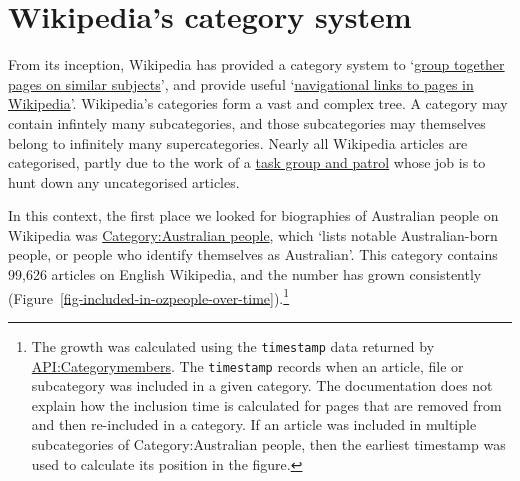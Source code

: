 \documentclass[
  a4paper,
  DIV=11,
  numbers=noendperiod]{scrreprt}
\begin{document}
\hypertarget{wikipedias-category-system}{%
\section{Wikipedia's category system}\label{wikipedias-category-system}}

From its inception, Wikipedia has provided a category system to
`\href{https://en.wikipedia.org/w/index.php?title=Help:Category\&oldid=1174603713}{group
together pages on similar subjects}', and provide useful
`\href{https://en.wikipedia.org/w/index.php?title=Wikipedia:Categorization\&oldid=1181497476}{navigational
links to pages in Wikipedia}'. Wikipedia's categories form a vast and
complex tree. A category may contain infintely many subcategories, and
those subcategories may themselves belong to infinitely many
supercategories. Nearly all Wikipedia articles are categorised, partly
due to the work of a
\href{https://en.wikipedia.org/wiki/Wikipedia:WikiProject_Categories/uncategorized}{task
group and patrol} whose job is to hunt down any uncategorised articles.

In this context, the first place we looked for biographies of Australian
people on Wikipedia was
\href{https://en.wikipedia.org/wiki/Category:Australian_people}{Category:Australian
people}, which `lists notable Australian-born people, or people who
identify themselves as Australian'. This category contains 99,626
articles on English Wikipedia, and the number has grown consistently
(Figure~\ref{fig-included-in-ozpeople-over-time}).\footnote{The growth
  was calculated using the \texttt{timestamp} data returned by
  \href{https://www.mediawiki.org/wiki/API:Categorymembers}{API:Categorymembers}.
  The \texttt{timestamp} records when an article, file or subcategory
  was included in a given category. The documentation does not explain
  how the inclusion time is calculated for pages that are removed from
  and then re-included in a category. If an article was included in
  multiple subcategories of Category:Australian people, then the
  earliest timestamp was used to calculate its position in the figure.}
\end{document}
